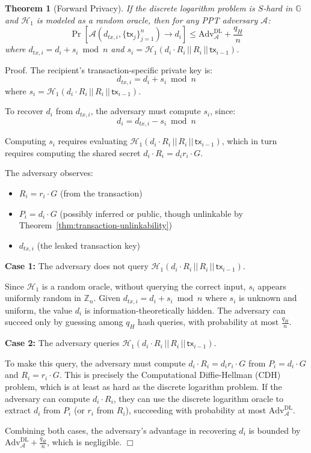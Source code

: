 \documentclass{article}
\newtheorem{theorem}{Theorem}[section]
\newenvironment{proof}{\textsf{Proof}.}{\hfill$\Box$}
\begin{document}
\begin{theorem}[Forward Privacy]
\label{thm:forward-privacy}
If the discrete logarithm problem is $S$-hard in $\mathbb{G}$ and $\mathcal{H}_1$ is modeled as a random oracle, then for any PPT adversary $\mathcal{A}$:
$$\Pr\left[\mathcal{A}(d_{tx,i}, \{\mathsf{tx}_j\}_{j=1}^n) \rightarrow d_i\right] \leq \text{Adv}^{\text{DL}}_{\mathcal{A}} + \frac{q_H}{n}$$
where $d_{tx,i} = d_i + s_i \bmod n$ and $s_i = \mathcal{H}_1(d_i \cdot R_i \,||\, R_i \,||\, \mathsf{tx}_{i-1})$.
\end{theorem}

\begin{proof}
The recipient's transaction-specific private key is:
$$d_{tx,i} = d_i + s_i \bmod n$$
where $s_i = \mathcal{H}_1(d_i \cdot R_i \,||\, R_i \,||\, \mathsf{tx}_{i-1})$.

To recover $d_i$ from $d_{tx,i}$, the adversary must compute $s_i$, since:
$$d_i = d_{tx,i} - s_i \bmod n$$

Computing $s_i$ requires evaluating $\mathcal{H}_1(d_i \cdot R_i \,||\, R_i \,||\, \mathsf{tx}_{i-1})$, which in turn requires computing the shared secret $d_i \cdot R_i = d_i r_i \cdot G$.

The adversary observes:
\begin{itemize}
\item $R_i = r_i \cdot G$ (from the transaction)
\item $P_i = d_i \cdot G$ (possibly inferred or public, though unlinkable by Theorem~\ref{thm:transaction-unlinkability})
\item $d_{tx,i}$ (the leaked transaction key)
\end{itemize}

\textbf{Case 1:} The adversary does not query $\mathcal{H}_1(d_i \cdot R_i \,||\, R_i \,||\, \mathsf{tx}_{i-1})$.

Since $\mathcal{H}_1$ is a random oracle, without querying the correct input, $s_i$ appears uniformly random in $\mathbb{Z}_n$. Given $d_{tx,i} = d_i + s_i \bmod n$ where $s_i$ is unknown and uniform, the value $d_i$ is information-theoretically hidden. The adversary can succeed only by guessing among $q_H$ hash queries, with probability at most $\frac{q_H}{n}$.

\textbf{Case 2:} The adversary queries $\mathcal{H}_1(d_i \cdot R_i \,||\, R_i \,||\, \mathsf{tx}_{i-1})$.

To make this query, the adversary must compute $d_i \cdot R_i = d_i r_i \cdot G$ from $P_i = d_i \cdot G$ and $R_i = r_i \cdot G$. This is precisely the Computational Diffie-Hellman (CDH) problem, which is at least as hard as the discrete logarithm problem. If the adversary can compute $d_i \cdot R_i$, they can use the discrete logarithm oracle to extract $d_i$ from $P_i$ (or $r_i$ from $R_i$), succeeding with probability at most $\text{Adv}^{\text{DL}}_{\mathcal{A}}$.

Combining both cases, the adversary's advantage in recovering $d_i$ is bounded by $\text{Adv}^{\text{DL}}_{\mathcal{A}} + \frac{q_H}{n}$, which is negligible.
\end{proof}
\end{document}
